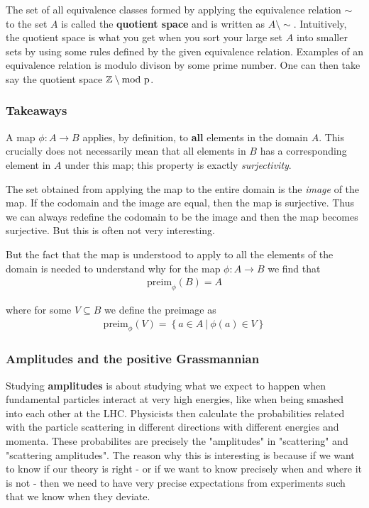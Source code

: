 \begin{deff}
    The set of all equivalence classes formed by applying the equivalence relation \(\sim\) to the set \(A\) is called the \textbf{quotient space} and is written as \(A\setminus\sim\). Intuitively, the quotient space is what you get when you sort your large set \(A\) into smaller sets by using some rules defined by the given equivalence relation. Examples of an equivalence relation is modulo divison by some prime number. One can then take say the quotient space \(\mathbb{Z} \setminus \rm{mod}\ p\).
\end{deff}
\subsubsection*{Takeaways}
A map \(\phi : A \to B\) applies, by definition, to \textbf{all} elements in the domain \(A\). This crucially does not necessarily mean that all elements in \(B\) has a corresponding element in \(A\) under this map; this property is exactly \textit{surjectivity}. 

The set obtained from applying the map to the entire domain is the \textit{image} of the map. If the codomain and the image are equal, then the map is surjective. Thus we can always redefine the codomain to be the image and then the map becomes surjective. But this is often not very interesting.

But the fact that the map is understood to apply to all the elements of the domain is needed to understand why for the map \(\phi : A \to B\) we find that \begin{align*}
    \text{preim}_{\phi}(B) = A 
\end{align*} 

where for some \(V \subseteq B\) we define the preimage as \begin{align*}
    \text{preim}_{\phi}(V) = \left\{ a \in A\ |\ \phi (a) \in V \right\}  
\end{align*} 

\subsubsection*{Amplitudes and the positive Grassmannian}
Studying \textbf{amplitudes}  is about studying what we expect to happen when fundamental particles interact at very high energies, like when being smashed into each other at the LHC. Physicists then calculate the probabilities related with the particle scattering in different directions with different energies and momenta. These probabilites are precisely the "amplitudes" in "scattering" and "scattering amplitudes". The reason why this is interesting is because if we want to know if our theory is right - or if we want to know precisely when and where it is not - then we need to have very precise expectations from experiments such that we know when they deviate. 

